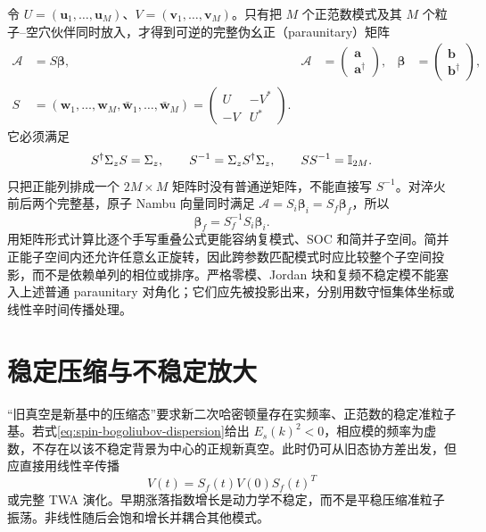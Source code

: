 令 $U=(\bm u_1,\ldots,\bm u_M)$、$V=(\bm v_1,\ldots,\bm v_M)$。只有把 $M$ 个正范数模式及其 $M$ 个粒子--空穴伙伴同时放入，才得到可逆的完整伪幺正（paraunitary）矩阵
\begin{equation}
  \begin{aligned}
    \bm{\mathcal A}&=S\bm\beta,
    &\bm{\mathcal A}&=\begin{pmatrix}\bm a\\\bm a^\dagger\end{pmatrix},
    &\bm\beta&=\begin{pmatrix}\bm b\\\bm b^\dagger\end{pmatrix},\\
    S&=(\bm w_1,\ldots,\bm w_M,
    \bar{\bm w}_1,\ldots,\bar{\bm w}_M)
    =\begin{pmatrix}U&-V^*\\-V&U^*\end{pmatrix}.
  \end{aligned}
  \label{eq:complete-paraunitary-matrix}
\end{equation}
它必须满足
\begin{equation}
  S^\dagger\Sigma_zS=\Sigma_z,
  \qquad
  S^{-1}=\Sigma_zS^\dagger\Sigma_z,
  \qquad
  SS^{-1}=\mathbb{I}_{2M}.
  \label{eq:paraunitary-identities}
\end{equation}
只把正能列排成一个 $2M\times M$ 矩阵时没有普通逆矩阵，不能直接写 $S^{-1}$。对淬火前后两个完整基，原子 Nambu 向量同时满足 $\bm{\mathcal A}=S_i\bm\beta_i=S_f\bm\beta_f$，所以
\begin{equation}
  \bm\beta_f=S_f^{-1}S_i\bm\beta_i.
  \label{eq:general-bdg-basis-map}
\end{equation}
用矩阵形式计算比逐个手写重叠公式更能容纳复模式、SOC 和简并子空间。简并正能子空间内还允许任意幺正旋转，因此跨参数匹配模式时应比较整个子空间投影，而不是依赖单列的相位或排序。严格零模、Jordan 块和复频不稳定模不能塞入上述普通 paraunitary 对角化；它们应先被投影出来，分别用数守恒集体坐标或线性辛时间传播处理。

\section{稳定压缩与不稳定放大}

“旧真空是新基中的压缩态”要求新二次哈密顿量存在实频率、正范数的稳定准粒子基。若式\eqref{eq:spin-bogoliubov-dispersion}给出 $E_s(k)^2<0$，相应模的频率为虚数，不存在以该不稳定背景为中心的正规新真空。此时仍可从旧态协方差出发，但应直接用线性辛传播
\begin{equation}
  V(t)=S_f(t)V(0)S_f(t)^T
  \label{eq:linear-covariance-propagation}
\end{equation}
或完整 TWA 演化。早期涨落指数增长是动力学不稳定，而不是平稳压缩准粒子振荡。非线性随后会饱和增长并耦合其他模式。

